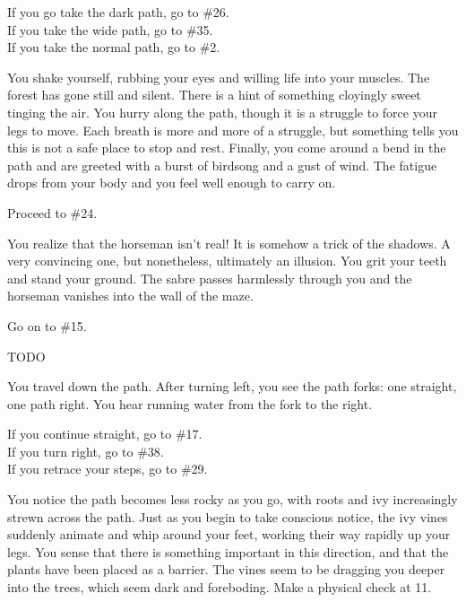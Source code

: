 \documentclass[green]{gl2018}
\begin{document}
\begin{LARGE}
\begin{location}{3}
\begin{fromhere}
 If you go take the dark path, go to \#26.\\
 If you take the wide path, go to \#35.\\
 If you take the normal path, go to \#2.
\end{fromhere}
\end{location}
\begin{location}{4}
You shake yourself, rubbing your eyes and willing life into your muscles.  The forest has gone still and silent.  There is a hint of something cloyingly sweet tinging the air.  You hurry along the path, though it is a struggle to force your legs to move.  Each breath is more and more of a struggle, but something tells you this is not a safe place to stop and rest.  Finally,  you come around a bend in the path and are greeted with a burst of birdsong and a gust of wind.  The fatigue drops from your body and you feel well enough to carry on.  
\begin{fromhere}
Proceed to \#24.
\end{fromhere}
\end{location}
\begin{location}{5}
You realize that the horseman isn't real! It is somehow a trick of the shadows. A very convincing one, but nonetheless, ultimately an illusion. You grit your teeth and stand your ground. The sabre passes harmlessly through you and the horseman vanishes into the wall of the maze. 
\begin{fromhere} Go on to \#15.\end{fromhere}
\end{location}
\begin{location}{6}
TODO
\end{location}
\begin{location}{7}
You travel down the path. After turning left, you see the path forks: one straight, one path right. You hear running water from the fork to the right. 
\begin{fromhere}
If you continue straight, go to \#17.\\
If you turn right,  go to \#38.\\
  If you retrace your steps, go to \#29.
\end{fromhere}
\end{location}
\begin{location}{8}
You notice the path becomes less rocky as you go, with roots and ivy increasingly strewn across the path.  Just as you begin to take conscious notice, the ivy vines suddenly animate and whip around your feet, working their way rapidly up your legs.  You sense that there is something important in this direction, and that the plants have been placed as a barrier.  The vines seem to be dragging you deeper into the trees, which seem dark and foreboding.  Make a physical check at 11.

\end{location}
\end{LARGE}
\end{document}
